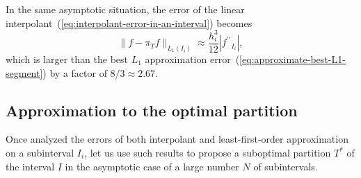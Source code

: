 \documentclass[a4paper,english]{IEEEtran}
\begin{document}
In the same asymptotic situation, the error of the linear interpolant~(\ref{eq:interpolant-error-in-an-interval})
becomes
\begin{equation}
\|{f}-{\pi_{T}}{f}\|_{{L_{1}}(I_{i})}\approx\frac{h_{i}^{3}}{12}\left|{{f}^{\prime\prime}}_{I_{i}}\right|,\label{eq:approximate-L1-interpolated-segment}
\end{equation}
which is larger than the best ${L_{1}}$ approximation error~(\ref{eq:approximate-best-L1-segment})
by a factor of $8/3\approx2.67$. 

\subsection{\label{sub:Approximation-to-the-optimal-partition}Approximation
to the optimal partition}

Once analyzed the errors of both interpolant and least-first-order
approximation on a subinterval $I_{i}$, let us use such results to
propose a suboptimal partition ${{T}^{\ast}}$ of the interval $I$ in
the asymptotic case of a large number $N$ of subintervals.
\end{document}
